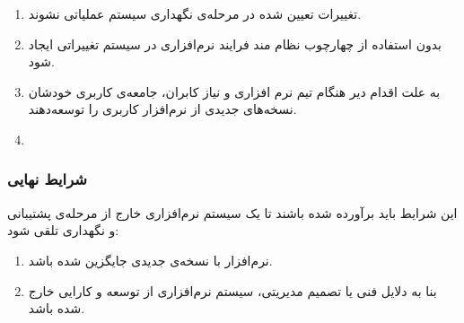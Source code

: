 \begin{enumerate}
\item تغییرات تعیین شده در مرحله‌ی نگهداری سیستم عملیاتی نشوند.
\item بدون استفاده از چهارچوب نظام مند فرایند نرم‌افزاری در سیستم تغییراتی ایجاد شود.
\item به علت اقدام دیر هنگام تیم نرم افزاری و نیاز کابران، جامعه‌ی کاربری خودشان نسخه‌های جدیدی از نرم‌افزار کاربری را توسعه‌دهند.
\item 
\end{enumerate}

\subsubsection{شرایط نهایی}
این شرایط باید برآورده شده باشند تا یک سیستم نرم‌افزاری خارج از مرحله‌ی پشتیبانی و نگهداری تلقی شود:
\begin{enumerate}
\item نرم‌افزار با نسخه‌ی جدیدی جایگزین شده باشد.
\item بنا به دلایل فنی یا تصمیم مدیریتی، سیستم نرم‌افزاری از توسعه و کارایی خارج شده باشد.
\end{enumerate}
\cite{more-process-patterns}


